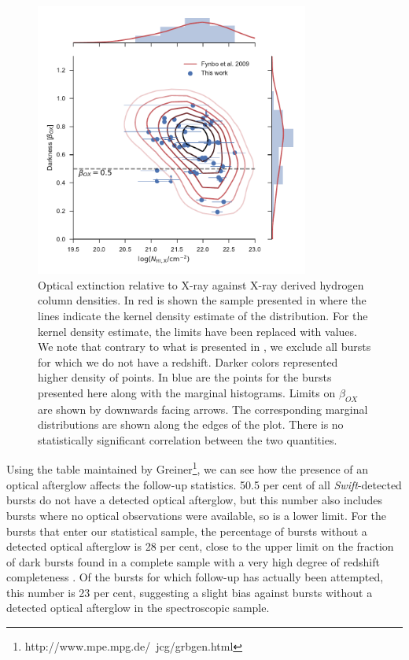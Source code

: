 \documentclass{aa}    %
\begin{document}
 
\begin{figure}[!ht]
	\centerline{\includegraphics[width=9cm]{figures/betaOX.pdf}} \caption{Optical
	extinction relative to X-ray against X-ray derived hydrogen column densities.
	In red is shown the sample presented in \citet{Fynbo2009} where the lines
	indicate the kernel density estimate of the distribution. For the kernel
	density estimate, the limits have been replaced with values. We note that
	contrary to what is presented in \citet{Fynbo2009}, we exclude all bursts for
	which we do not have a redshift. Darker colors represented higher density of
	points. In blue are the points for the bursts presented here along with the
	marginal histograms. Limits on $\beta_{OX}$ are shown by downwards facing
	arrows. The corresponding marginal distributions are shown along the edges of
	the plot. There is no statistically significant correlation between the two
	quantities.} \label{fig:betaOX}
\end{figure}

Using the table maintained by
Greiner\footnote{http://www.mpe.mpg.de/~jcg/grbgen.html}, we can see how the
presence of an optical afterglow affects the follow-up statistics. 50.5 per cent
of all \textit{Swift}-detected bursts do not have a detected optical afterglow,
but this number also includes bursts where no optical observations were
available, so is a lower limit. For the bursts that enter our statistical
sample, the percentage of bursts without a detected optical afterglow is 28 per
cent, close to the upper limit on the fraction of dark bursts found in a
complete sample with a very high degree of redshift completeness
\citep{Melandri2012}. Of the bursts for which follow-up has actually been
attempted, this number is 23 per cent, suggesting a slight bias against
bursts without a detected optical afterglow in the spectroscopic sample. 
\end{document}
